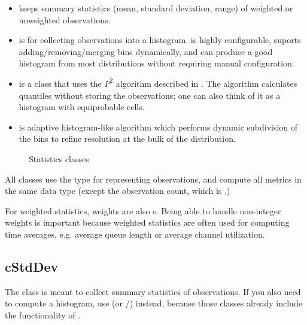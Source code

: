 \begin{itemize}
  \item {} keeps summary statistics (mean, standard deviation,
    range) of weighted or unweighted observations.
  \item {} is for collecting observations into a histogram.
     is highly configurable, suports adding/removing/merging bins
    dynamically, and can produce a good histogram from most distributions
    without requiring manual configuration.
  \item {} is a class that uses the $P^{2}$ algorithm
    described in \cite{JCh85}. The algorithm calculates quantiles without
    storing the observations; one can also think of it as a histogram
    with equiprobable cells.
  \item {} is adaptive histogram-like algorithm
    which performs dynamic subdivision of the bins to refine resolution
    at the bulk of the distribution.
\end{itemize}

\begin{figure}[htbp]
  \begin{center}
    
    \caption{Statistics classes}
  \end{center}
\end{figure}

All classes use the  type for representing observations,
and compute all metrics in the same data type (except the observation
count, which is .)

For weighted statistics, weights are also s. Being able to
handle non-integer weights is important because weighted statistics
are often used for computing time averages, e.g. average queue length
or average channel utilization.

\subsection{cStdDev}
\label{sec:sim-lib:cstatistic-and-descendants}

The  class is meant to collect summary statistics of
observations. If you also need to compute a histogram, use 
(or /) instead, because those classes
already include the functionality of .


